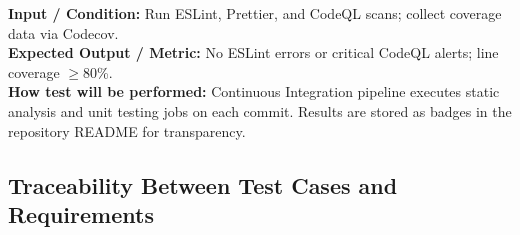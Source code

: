 \documentclass[12pt, titlepage]{article}
\begin{document}
    \textbf{Input / Condition:} Run ESLint, Prettier, and CodeQL scans; collect coverage data via Codecov. \\

    \textbf{Expected Output / Metric:} No ESLint errors or critical CodeQL alerts; line coverage $\geq 80$\%. \\

    \textbf{How test will be performed:}
    Continuous Integration pipeline executes static analysis and unit testing jobs on each commit. Results are stored as badges in the repository README for transparency.



\subsection{Traceability Between Test Cases and Requirements}
\end{document}
